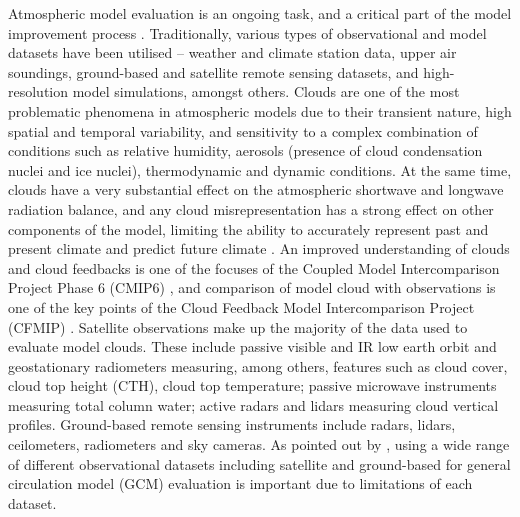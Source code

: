 Atmospheric model evaluation is an ongoing task, and a critical
part of the model improvement process \citep{eyring2019,hourdin2017,schmidt2017}.
Traditionally, various types of observational and model datasets have been
utilised -- weather and climate station data, upper air soundings,
ground-based and satellite remote sensing datasets, and high-resolution model
simulations, amongst others.
Clouds are one of the most problematic phenomena in atmospheric models due
to their transient nature, high spatial and temporal variability, and
sensitivity to a complex combination of conditions such as relative humidity,
aerosols (presence of cloud condensation nuclei and ice nuclei), thermodynamic and dynamic conditions. At the same time, clouds have a very substantial
effect on the atmospheric shortwave and longwave radiation balance, and any
cloud misrepresentation has a strong effect on other components of the
model, limiting the ability to accurately represent past and present climate and
predict future climate \citep{zadra2018}.
An improved understanding of clouds and cloud feedbacks is one of the focuses of the Coupled Model
Intercomparison Project Phase 6 (CMIP6) \citep{eyring2016}, and comparison of model
cloud with observations is one of the key points of
the Cloud Feedback Model Intercomparison Project (CFMIP) \citep{webb2017}.
Satellite observations make up the majority of the data used to
evaluate model clouds. These include passive visible and IR
low earth orbit and geostationary radiometers measuring, among others,
features such as cloud cover, cloud top height (CTH), cloud top
temperature; passive microwave instruments measuring total column water; active
radars and lidars measuring cloud vertical profiles.
Ground-based remote
sensing instruments include radars, lidars, ceilometers, radiometers and sky
cameras. As pointed out by \cite{williams2017}, using a wide range of different
observational datasets including satellite and ground-based
for general circulation model (GCM) evaluation is important due to limitations of each dataset.

